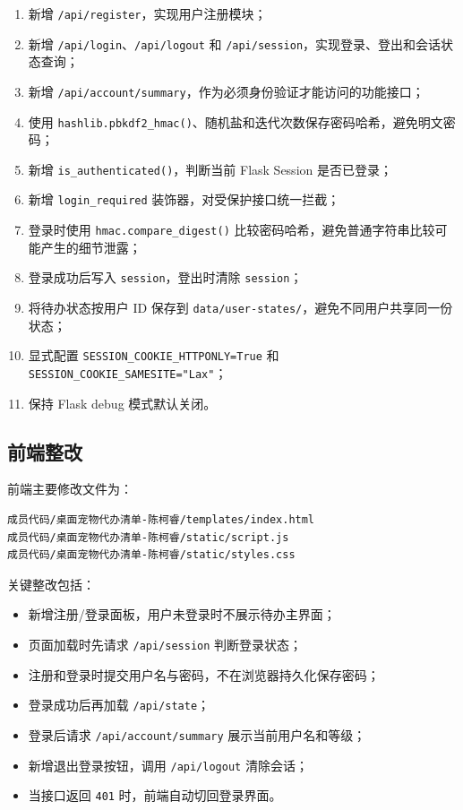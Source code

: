 \documentclass[12pt,a4paper]{ctexart}
\begin{document}
\begin{enumerate}[leftmargin=2.5em]
    \item 新增 \texttt{/api/register}，实现用户注册模块；
    \item 新增 \texttt{/api/login}、\texttt{/api/logout} 和 \texttt{/api/session}，实现登录、登出和会话状态查询；
    \item 新增 \texttt{/api/account/summary}，作为必须身份验证才能访问的功能接口；
    \item 使用 \texttt{hashlib.pbkdf2\_hmac()}、随机盐和迭代次数保存密码哈希，避免明文密码；
    \item 新增 \texttt{is\_authenticated()}，判断当前 Flask Session 是否已登录；
    \item 新增 \texttt{login\_required} 装饰器，对受保护接口统一拦截；
    \item 登录时使用 \texttt{hmac.compare\_digest()} 比较密码哈希，避免普通字符串比较可能产生的细节泄露；
    \item 登录成功后写入 \texttt{session}，登出时清除 \texttt{session}；
    \item 将待办状态按用户 ID 保存到 \texttt{data/user-states/}，避免不同用户共享同一份状态；
    \item 显式配置 \texttt{SESSION\_COOKIE\_HTTPONLY=True} 和 \texttt{SESSION\_COOKIE\_SAMESITE="Lax"}；
    \item 保持 Flask debug 模式默认关闭。
\end{enumerate}

\subsection{前端整改}

前端主要修改文件为：

\begin{verbatim}
成员代码/桌面宠物代办清单-陈柯睿/templates/index.html
成员代码/桌面宠物代办清单-陈柯睿/static/script.js
成员代码/桌面宠物代办清单-陈柯睿/static/styles.css
\end{verbatim}

关键整改包括：

\begin{itemize}[leftmargin=2.5em]
    \item 新增注册/登录面板，用户未登录时不展示待办主界面；
    \item 页面加载时先请求 \texttt{/api/session} 判断登录状态；
    \item 注册和登录时提交用户名与密码，不在浏览器持久化保存密码；
    \item 登录成功后再加载 \texttt{/api/state}；
    \item 登录后请求 \texttt{/api/account/summary} 展示当前用户名和等级；
    \item 新增退出登录按钮，调用 \texttt{/api/logout} 清除会话；
    \item 当接口返回 \texttt{401} 时，前端自动切回登录界面。
\end{itemize}
\end{document}
